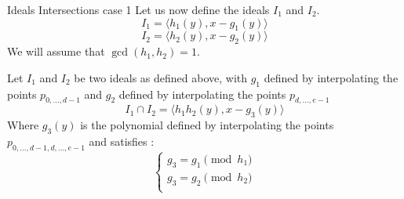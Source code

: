 \documentclass{beamer}
\begin{document}
\begin{frame}{Ideals Intersections case 1}
    Let us now define the ideals $I_{1}$ and $I_{2}$.
\begin{displaymath}
    I_{1} = \langle h_{1}(y), x - g_{1}(y) \rangle
\end{displaymath}
\begin{displaymath}
    I_{2} = \langle h_{2}(y), x - g_{2}(y) \rangle
\end{displaymath}
We will assume that $\gcd(h_{1}, h_{2}) = 1$.

\begin{theorem}
    Let $I_{1}$ and $I_{2}$ be two ideals as defined above, with $g_{1}$ defined by interpolating the points $p_{0,\dots,d-1}$ and $g_{2}$ defined by interpolating the points $p_{d,\dots,e-1}$
    \begin{displaymath}
        I_{1} \cap I_{2} = \langle h_{1}h_{2}(y), x - g_{3}(y) \rangle
    \end{displaymath}
    Where $g_{3}(y)$ is the polynomial defined by interpolating the points $p_{0,\dots,d-1,d,\dots,e-1}$ and satisfies :
    \begin{displaymath}
    \left\{
    \begin{array}{ll}
        g_{3} = g_{1} \pmod {h_{1}} \\
        g_{3} = g_{2} \pmod {h_{2}} \\
    \end{array}
    \right.
    \end{displaymath}
\end{theorem}
\end{frame}
\end{document}
